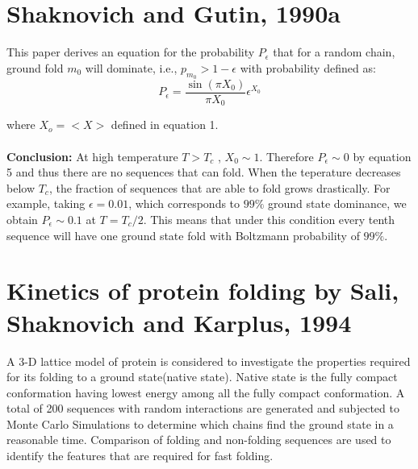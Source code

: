 \documentclass[12pt]{article}
\theoremstyle{definition}
\theoremstyle{remark}
\begin{document}
\section{Shaknovich and Gutin, 1990a}

This paper derives an equation for the probability $P_{\epsilon}$ that for a random chain, ground fold $m_{0}$ will dominate, i.e., $p_{m_{0}} > 1-\epsilon$ with probability defined as:
\begin{equation}
	P_\epsilon = \frac{\sin (\pi X_0)}{\pi X_0} \epsilon^{X_0}
\end{equation}

where $X_o = <X>$ defined in equation 1.
\\\\
\textbf{Conclusion:} At high temperature $T>T_c$ , $X_0\sim1$. Therefore $P_\epsilon \sim 0$ by equation 5 and thus there are no sequences that can fold. When the teperature decreases below $T_c$, the fraction of sequences that are able to fold grows drastically. For example, taking $\epsilon = 0.01$, which corresponds to $99\%$ ground state dominance, we obtain $P_\epsilon \sim 0.1$ at $T = T_c/2$. This means that under this condition every tenth sequence will have one ground state fold with Boltzmann probability of $99\%$.

\section{Kinetics of protein folding by Sali, Shaknovich and Karplus, 1994}

A 3-D lattice model of protein is considered to investigate the properties required for its folding to a ground state(native state). Native state is the fully compact conformation having lowest energy among all the fully compact conformation. A total of 200 sequences with random interactions are generated and subjected to Monte Carlo Simulations to determine which chains find the ground state in a reasonable time. Comparison of folding and non-folding sequences are used to identify the features that are required for fast folding.
\end{document}
